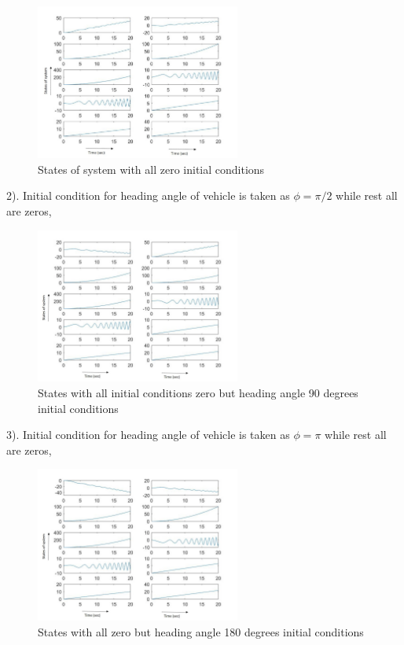 \documentclass[12pt]{article}
\begin{document}
\begin{figure}[H]
\centering
\includegraphics[width=0.6\textwidth]{zero.jpg}
\captionsetup{labelformat=empty}
\caption{States of system with all zero initial conditions}
\end{figure}

2). Initial condition for heading angle of vehicle is taken as $\phi=\pi/2$ while rest all are zeros,

\begin{figure}[H]
\centering
\includegraphics[width=0.6\textwidth]{piby2.jpg}
\captionsetup{labelformat=empty}
\caption{States with all initial conditions zero but heading angle 90 degrees initial conditions}
\end{figure}

3). Initial condition for heading angle of vehicle is taken as $\phi=\pi$ while rest all are zeros,
\begin{figure}[H]
\centering
\includegraphics[width=0.6\textwidth]{pi.jpg}
\captionsetup{labelformat=empty}
\caption{States with all zero but heading angle 180 degrees initial conditions}
\end{figure}
\end{document}
